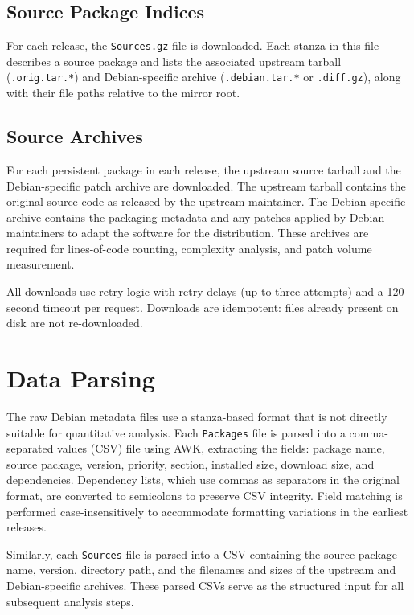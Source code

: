 \subsection*{Source Package Indices}
For each release, the \texttt{Sources.gz} file is downloaded. Each stanza in this file describes a source package and lists the associated upstream tarball (\texttt{.orig.tar.*}) and Debian-specific archive (\texttt{.debian.tar.*} or \texttt{.diff.gz}), along with their file paths relative to the mirror root.

\subsection*{Source Archives}
For each persistent package in each release, the upstream source tarball and the Debian-specific patch archive are downloaded. The upstream tarball contains the original source code as released by the upstream maintainer. The Debian-specific archive contains the packaging metadata and any patches applied by Debian maintainers to adapt the software for the distribution. These archives are required for lines-of-code counting, complexity analysis, and patch volume measurement.

All downloads use retry logic with retry delays (up to three attempts) and a 120-second timeout per request. Downloads are idempotent: files already present on disk are not re-downloaded.

\section{Data Parsing}
\label{sec:parsing}

The raw Debian metadata files use a stanza-based format that is not directly suitable for quantitative analysis. Each \texttt{Packages} file is parsed into a comma-separated values (CSV) file using AWK, extracting the fields: package name, source package, version, priority, section, installed size, download size, and dependencies. Dependency lists, which use commas as separators in the original format, are converted to semicolons to preserve CSV integrity. Field matching is performed case-insensitively to accommodate formatting variations in the earliest releases.

Similarly, each \texttt{Sources} file is parsed into a CSV containing the source package name, version, directory path, and the filenames and sizes of the upstream and Debian-specific archives. These parsed CSVs serve as the structured input for all subsequent analysis steps.

